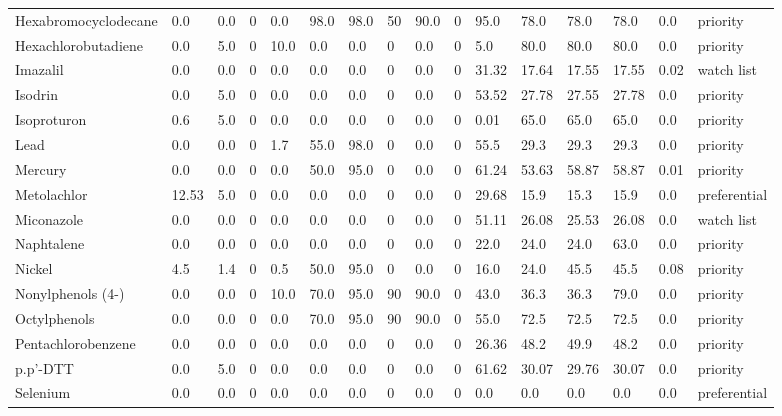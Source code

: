 \begin{tabular}{llllllllllllllll}
\cline{1-16}
Hexabromocyclodecane & 0.0 & 0.0 & 0 & 0.0 & 98.0 & 98.0 & 50 & 90.0 & 0 & 95.0 & 78.0 & 78.0 & 78.0 & 0.0 & priority \\
\cline{1-16}
Hexachlorobutadiene & 0.0 & 5.0 & 0 & 10.0 & 0.0 & 0.0 & 0 & 0.0 & 0 & 5.0 & 80.0 & 80.0 & 80.0 & 0.0 & priority \\
\cline{1-16}
Imazalil & 0.0 & 0.0 & 0 & 0.0 & 0.0 & 0.0 & 0 & 0.0 & 0 & 31.32 & 17.64 & 17.55 & 17.55 & 0.02 & watch list \\
\cline{1-16}
Isodrin & 0.0 & 5.0 & 0 & 0.0 & 0.0 & 0.0 & 0 & 0.0 & 0 & 53.52 & 27.78 & 27.55 & 27.78 & 0.0 & priority \\
\cline{1-16}
Isoproturon & 0.6 & 5.0 & 0 & 0.0 & 0.0 & 0.0 & 0 & 0.0 & 0 & 0.01 & 65.0 & 65.0 & 65.0 & 0.0 & priority \\
\cline{1-16}
Lead & 0.0 & 0.0 & 0 & 1.7 & 55.0 & 98.0 & 0 & 0.0 & 0 & 55.5 & 29.3 & 29.3 & 29.3 & 0.0 & priority \\
\cline{1-16}
Mercury & 0.0 & 0.0 & 0 & 0.0 & 50.0 & 95.0 & 0 & 0.0 & 0 & 61.24 & 53.63 & 58.87 & 58.87 & 0.01 & priority \\
\cline{1-16}
Metolachlor & 12.53 & 5.0 & 0 & 0.0 & 0.0 & 0.0 & 0 & 0.0 & 0 & 29.68 & 15.9 & 15.3 & 15.9 & 0.0 & preferential \\
\cline{1-16}
Miconazole & 0.0 & 0.0 & 0 & 0.0 & 0.0 & 0.0 & 0 & 0.0 & 0 & 51.11 & 26.08 & 25.53 & 26.08 & 0.0 & watch list \\
\cline{1-16}
Naphtalene & 0.0 & 0.0 & 0 & 0.0 & 0.0 & 0.0 & 0 & 0.0 & 0 & 22.0 & 24.0 & 24.0 & 63.0 & 0.0 & priority \\
\cline{1-16}
Nickel & 4.5 & 1.4 & 0 & 0.5 & 50.0 & 95.0 & 0 & 0.0 & 0 & 16.0 & 24.0 & 45.5 & 45.5 & 0.08 & priority \\
\cline{1-16}
Nonylphenols (4-) & 0.0 & 0.0 & 0 & 10.0 & 70.0 & 95.0 & 90 & 90.0 & 0 & 43.0 & 36.3 & 36.3 & 79.0 & 0.0 & priority \\
\cline{1-16}
Octylphenols & 0.0 & 0.0 & 0 & 0.0 & 70.0 & 95.0 & 90 & 90.0 & 0 & 55.0 & 72.5 & 72.5 & 72.5 & 0.0 & priority \\
\cline{1-16}
Pentachlorobenzene & 0.0 & 0.0 & 0 & 0.0 & 0.0 & 0.0 & 0 & 0.0 & 0 & 26.36 & 48.2 & 49.9 & 48.2 & 0.0 & priority \\
\cline{1-16}
p.p'-DTT & 0.0 & 5.0 & 0 & 0.0 & 0.0 & 0.0 & 0 & 0.0 & 0 & 61.62 & 30.07 & 29.76 & 30.07 & 0.0 & priority \\
\cline{1-16}
Selenium & 0.0 & 0.0 & 0 & 0.0 & 0.0 & 0.0 & 0 & 0.0 & 0 & 0.0 & 0.0 & 0.0 & 0.0 & 0.0 & preferential \\

\end{tabular}
